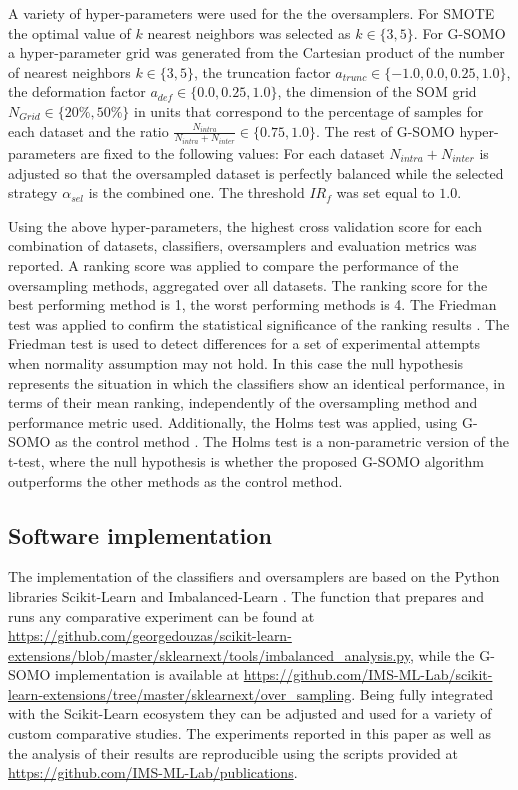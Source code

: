 \documentclass[parskip=full]{scrartcl}
\begin{document}
A variety of hyper-parameters were used for the the oversamplers. For SMOTE the
optimal value of $k$ nearest neighbors was selected as $k \in \{3, 5 \}$. For
G-SOMO a hyper-parameter grid was generated from the Cartesian product of the
number of nearest neighbors $k \in \{3, 5\} $, the truncation factor 
$ a_{trunc} \in \{-1.0, 0.0, 0.25, 1.0\} $, the deformation factor $ a_{def} \in \{0.0, 0.25, 1.0\} $, 
the dimension of the SOM grid $ N_{Grid} \in \{20\%, 50\% \} $ in units
that correspond to the percentage of samples for each dataset and the ratio
$ \frac{N_{intra}}{N_{intra} + N_{inter}} \in \{0.75, 1.0 \} $. The rest of G-SOMO
hyper-parameters are fixed to the following values: For each dataset $ N_{intra} + N_{inter} $ 
is adjusted so that the oversampled dataset is perfectly balanced
while the selected strategy $ \alpha_{sel} $ is the combined one. The threshold
$ IR_{f} $ was set equal to $ 1.0 $.

Using the above hyper-parameters, the highest cross validation score for each
combination of datasets, classifiers, oversamplers and evaluation metrics was
reported. A ranking score was applied to compare the performance of the
oversampling methods, aggregated over all datasets. The ranking score for the
best performing method is 1, the worst performing methods is 4. The Friedman
test was applied to confirm the statistical significance of the ranking results
\cite{Guyon2003}. The Friedman test is used to detect differences for a set of
experimental attempts when normality assumption may not hold. In this case the
null hypothesis represents the situation in which the classifiers show an
identical performance, in terms of their mean ranking, independently of the
oversampling method and performance metric used. Additionally, the Holms test
was applied, using G-SOMO as the control method \cite{Guyon2003}. The Holms test
is a non-parametric version of the t-test, where the null hypothesis is whether
the proposed G-SOMO algorithm outperforms the other methods as the control
method.

\subsection{Software implementation}

The implementation of the classifiers and oversamplers are based on the Python
libraries Scikit-Learn \cite{Pedregosa2012} and Imbalanced-Learn
\cite{Lemaitre2016}. The function that prepares and runs any comparative
experiment can be found at
\url{https://github.com/georgedouzas/scikit-learn-extensions/blob/master/sklearnext/tools/imbalanced_analysis.py},
while the G-SOMO implementation is available at
\url{https://github.com/IMS-ML-Lab/scikit-learn-extensions/tree/master/sklearnext/over_sampling}.
Being fully integrated with the Scikit-Learn ecosystem they can be adjusted and
used for a variety of custom comparative studies. The experiments reported in
this paper as well as the analysis of their results are reproducible using the
scripts provided at \url{https://github.com/IMS-ML-Lab/publications}.
\end{document}
